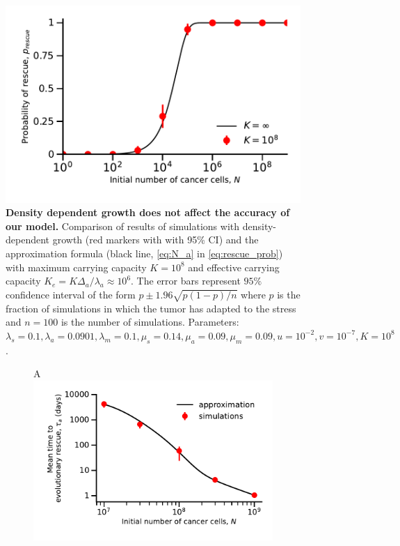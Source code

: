 \documentclass[12pt]{extarticle}
\begin{document}
\begin{appendices}
\begin{figure}[h]
\vspace*{1\baselineskip}
\includegraphics[width=1\textwidth]{Figures/SurvPlotNDataLogisticK.pdf}
\caption{\textbf{Density dependent growth does not affect the accuracy of our model.} Comparison of results of simulations  with density-dependent growth (red markers with with 95\% CI) and the approximation formula (black line, \cref{eq:N_a} in \cref{eq:rescue_prob}) with maximum carrying capacity $K=10^8$ and effective carrying capacity $K_e=K\Delta_a/\lambda_a\approx10^6$. The error bars represent $95\%$ confidence interval of the form $p\pm1.96\sqrt{p\left(1-p\right)/n}$ where $p$ is the  fraction of simulations in which the tumor has adapted to the stress and $n=100$ is the number of simulations. Parameters: $\lambda_s=0.1,\lambda_a=0.0901,\lambda_m=0.1,\mu_s=0.14,\mu_a=0.09,\mu_m=0.09, u=10^{-2}, v=10^{-7}, K=10^8$.}
\label{LogisticPlot}
\end{figure}
\begin{figure}[!htb]
\begin{subfigure}{0.5\textwidth}
A\\
\includegraphics[width=1\textwidth]{Figures/EvolutionaryRescueTime.pdf}

\end{subfigure}
\end{figure}
\end{appendices}
\end{document}
